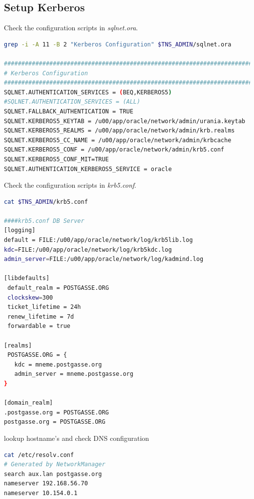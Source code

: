 \documentclass[a4paper,,tablecaptionabove]{scrartcl}
\begin{document}
\hypertarget{setup-kerberos}{%
\subsection{Setup Kerberos}\label{setup-kerberos}}

Check the configuration scripts in \emph{sqlnet.ora}.

\begin{lstlisting}[language=bash]
grep -i -A 11 -B 2 "Kerberos Configuration" $TNS_ADMIN/sqlnet.ora

##########################################################################
# Kerberos Configuration
##########################################################################
SQLNET.AUTHENTICATION_SERVICES = (BEQ,KERBEROS5)
#SQLNET.AUTHENTICATION_SERVICES = (ALL)
SQLNET.FALLBACK_AUTHENTICATION = TRUE
SQLNET.KERBEROS5_KEYTAB = /u00/app/oracle/network/admin/urania.keytab
SQLNET.KERBEROS5_REALMS = /u00/app/oracle/network/admin/krb.realms
SQLNET.KERBEROS5_CC_NAME = /u00/app/oracle/network/admin/krbcache
SQLNET.KERBEROS5_CONF = /u00/app/oracle/network/admin/krb5.conf
SQLNET.KERBEROS5_CONF_MIT=TRUE
SQLNET.AUTHENTICATION_KERBEROS5_SERVICE = oracle
\end{lstlisting}

Check the configuration scripts in \emph{krb5.conf}.

\begin{lstlisting}[language=bash]
cat $TNS_ADMIN/krb5.conf

####krb5.conf DB Server
[logging]
default = FILE:/u00/app/oracle/network/log/krb5lib.log
kdc=FILE:/u00/app/oracle/network/log/krb5kdc.log
admin_server=FILE:/u00/app/oracle/network/log/kadmind.log

[libdefaults]
 default_realm = POSTGASSE.ORG
 clockskew=300
 ticket_lifetime = 24h
 renew_lifetime = 7d
 forwardable = true

[realms]
 POSTGASSE.ORG = {
   kdc = mneme.postgasse.org
   admin_server = mneme.postgasse.org
}

[domain_realm]
.postgasse.org = POSTGASSE.ORG
postgasse.org = POSTGASSE.ORG
\end{lstlisting}

lookup hostname's and check DNS configuration

\begin{lstlisting}[language=bash]
cat /etc/resolv.conf
# Generated by NetworkManager
search aux.lan postgasse.org
nameserver 192.168.56.70
nameserver 10.154.0.1
\end{lstlisting}
\end{document}
